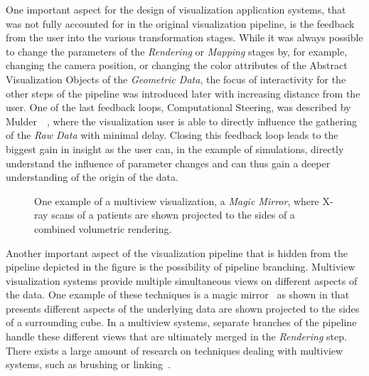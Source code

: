 One important aspect for the design of visualization application systems, that was not fully accounted for in the original visualization pipeline, is the feedback from the user into the various transformation stages.  While it was always possible to change the parameters of the \emph{Rendering} or \emph{Mapping} stages by, for example, changing the camera position, or changing the color attributes of the Abstract Visualization Objects of the \emph{Geometric Data}, the focus of interactivity for the other steps of the pipeline was introduced later with increasing distance from the user.  One of the last feedback loops, Computational Steering, was described by Mulder~\etal~\cite{mulder1999survey}, where the visualization user is able to directly influence the gathering of the \emph{Raw Data} with minimal delay.  Closing this feedback loop leads to the biggest gain in insight as the user can, in the example of simulations, directly understand the influence of parameter changes and can thus gain a deeper understanding of the origin of the data.

\begin{figure}
  \centering
  \caption{One example of a multiview visualization, a \emph{Magic Mirror}, where X-ray scans of a patients are shown projected to the sides of a combined volumetric rendering.}
  \label{fig:intro:mm}
\end{figure}

Another important aspect of the visualization pipeline that is hidden from the pipeline depicted in the figure is the possibility of pipeline branching.  Multiview visualization systems provide multiple simultaneous views on different aspects of the data.  One example of these techniques is a magic mirror~\cite{konig1999multiple} as shown in  that presents different aspects of the underlying data are shown projected to the sides of a surrounding cube.  In a multiview systems, separate branches of the pipeline handle these different views that are ultimately merged in the \emph{Rendering} step.  There exists a large amount of research on techniques dealing with multiview systems, such as brushing or linking~\cite{tory2003mental}.

